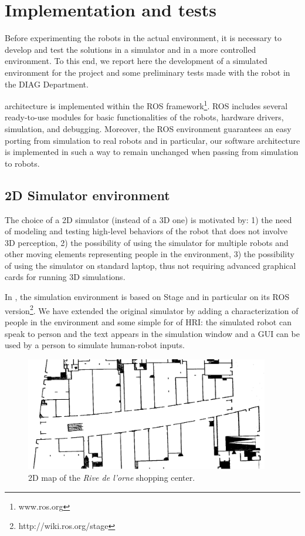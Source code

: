 \section{Implementation and tests}

Before experimenting the robots in the actual environment, it is necessary to develop and test the solutions in a simulator and in a more controlled environment. To this end, we report here the development of a simulated environment for the project and some preliminary tests made with the robot in the DIAG Department.

\coaches architecture is implemented within the ROS framework\footnote{www.ros.org}.
ROS includes several ready-to-use modules for basic functionalities of the robots, hardware drivers, simulation, and debugging.
Moreover, the ROS environment guarantees an easy porting from simulation to real robots and in particular, our software architecture is implemented in such a way to remain unchanged when passing from simulation to robots.


\subsection{2D Simulator environment}

The choice of a 2D simulator (instead of a 3D one) is motivated by: 1) the need of modeling and testing high-level behaviors of the robot that does not involve 3D perception, 2) the possibility of using the simulator for multiple robots and other moving elements representing people in the environment, 3) the possibility of using the simulator on standard laptop, thus not requiring advanced graphical cards for running 3D simulations.

In \coaches, the simulation environment is based on Stage and in particular on its ROS version\footnote{http://wiki.ros.org/stage}. We have extended the original simulator by adding a characterization of people in the environment and some simple for of HRI: the simulated robot can speak to person and the text appears in the simulation window
and a GUI can be used by a person to simulate human-robot inputs.


\begin{figure}
\centering
\includegraphics[width=0.95\textwidth]{fig/Rive1.png}
\caption{2D map of the \emph{Rive de l'orne} shopping center.}
\label{fig:stage}
\end{figure}


